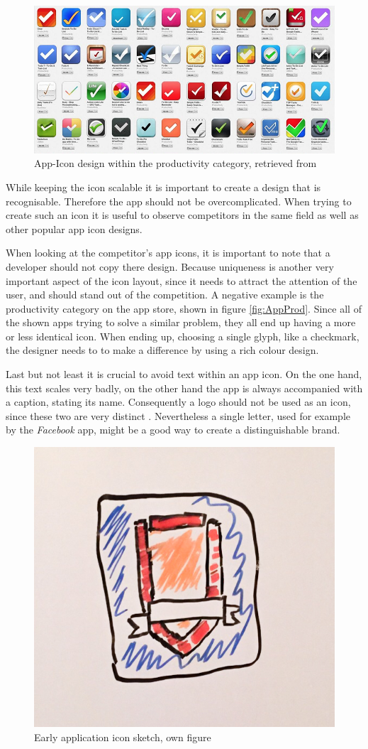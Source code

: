 \begin{figure}[h]
  	\centering
  	\includegraphics[width=0.7\linewidth]{./images/productivity-icons.png}
  	\caption{App-Icon design within the productivity category, retrieved from \cite{Flarup:2015aa}}
	\label{fig:AppProd}
\end{figure}
\nocite{Flarup:2015aa}

While keeping the icon scalable it is important to create a design that is recognisable. Therefore the app should not be overcomplicated. When trying to create such an icon it is useful to observe competitors in the same field as well as other popular app icon designs. \cite{Flarup:2015aa}

When looking at the competitor's app icons, it is important to note that a developer should not copy there design. Because uniqueness is another very important aspect of the icon layout, since it needs to attract the attention of the user, and should stand out of the competition. A negative example is the productivity category on the app store, shown in figure \vref{fig:AppProd}. Since all of the shown apps trying to solve a similar problem, they all end up having a more or less identical icon. When ending up, choosing a single glyph, like a checkmark, the designer needs to to make a difference by using a rich colour design. \cite{Flarup:2015aa}

Last but not least it is crucial to avoid text within an app icon. On the one hand, this text scales very badly, on the other hand the app is always accompanied with a caption, stating its name. Consequently a logo should not be used as an icon, since these two are very distinct \cite{Flarup:2015ab}. Nevertheless a single letter, used for example by the \emph{Facebook} app, might be a good way to create a distinguishable brand.

\begin{figure}[h]
  	\centering
  	\includegraphics[width=0.5\linewidth]{./images/app-sketch.jpg}
  	\caption{Early application icon sketch, own figure}
	\label{fig:AppSketch}
\end{figure}

